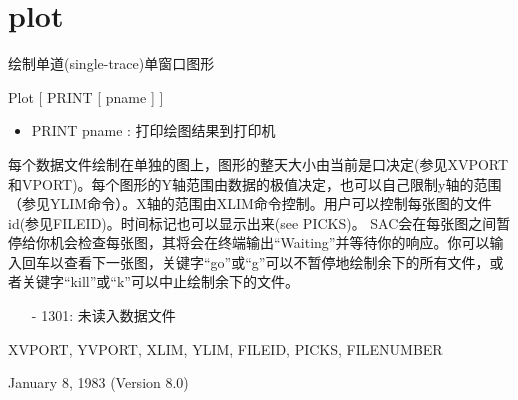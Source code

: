 \section{plot}
\label{cmd:plot}

绘制单道(single-trace)单窗口图形

Plot [ PRINT [ pname ] ]

\begin{itemize}
\item PRINT pname : 打印绘图结果到打印机
\end{itemize}

每个数据文件绘制在单独的图上，图形的整天大小由当前是口决定(参见XVPORT和VPORT)。每个图形的Y轴范围由数据的极值决定，也可以自己限制y轴的范围（参见YLIM命令）。X轴的范围由XLIM命令控制。用户可以控制每张图的文件id(参见FILEID)。时间标记也可以显示出来(see PICKS)。
SAC会在每张图之间暂停给你机会检查每张图，其将会在终端输出``Waiting''并等待你的响应。你可以输入回车以查看下一张图，关键字``go''或``g''可以不暂停地绘制余下的所有文件，或者关键字``kill''或``k''可以中止绘制余下的文件。

\begin{itemize}
\item[-]1301: 未读入数据文件
\end{itemize}

XVPORT, YVPORT, XLIM, YLIM, FILEID, PICKS, FILENUMBER

January 8, 1983 (Version 8.0)
